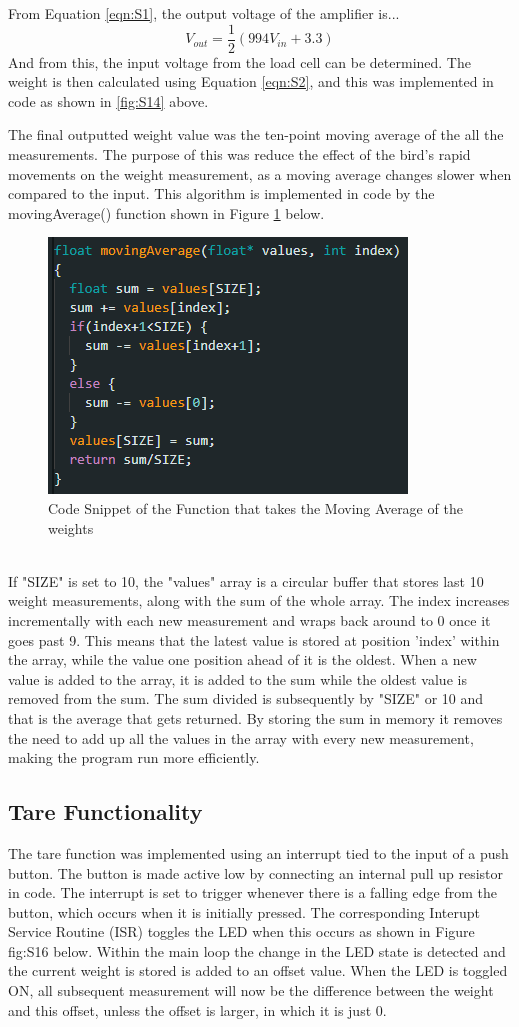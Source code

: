 \documentclass[class=report,11pt,crop=false]{standalone}
\begin{document}
	From Equation \ref{eqn:S1}, the output voltage of the amplifier is...
	\[V_{out} = \frac{1}{2}\left(994V_{in} + 3.3\right) \]
	And from this, the input voltage from the load cell can be determined. The weight is then calculated using Equation \ref{eqn:S2}, and this was implemented in code as shown in \ref{fig:S14} above.
	
	The final outputted weight value was the ten-point moving average of the all the measurements. The purpose of this was reduce the effect of the bird's rapid movements on the weight measurement, as a moving average changes slower when compared to the input. This algorithm is implemented in code by the movingAverage() function shown in Figure \ref{fig:S15} below.
	\begin{figure}[h!]
		\centering
		\includegraphics[width=0.5\linewidth]{Figures/MovingAverage.png}
		\caption{Code Snippet of the Function that takes the Moving Average of the weights}
		\label{fig:S15}
	\end{figure} \\
	If "SIZE" is set to 10, the "values" array is a circular buffer that stores last 10 weight measurements, along with the sum of the whole array. The index increases incrementally with each new measurement and wraps back around to 0 once it goes past 9. This means that the latest value is stored at position 'index' within the array, while the value one position ahead of it is the oldest. When a new value is added to the array, it is added to the sum while the oldest value is removed from the sum. The sum divided is subsequently by "SIZE" or 10 and that is the average that gets returned. By storing the sum in memory it removes the need to add up all the values in the array with every new measurement, making the program run more efficiently.
	
	\subsection{Tare Functionality}
	The tare function was implemented using an interrupt tied to the input of a push button. The button is made active low by connecting an internal pull up resistor in code. The interrupt is set to trigger whenever there is a falling edge from the button, which occurs when it is initially pressed. The corresponding Interupt Service Routine (ISR) toggles the LED when this occurs as shown in Figure {fig:S16} below. Within the main loop the change in the LED state is detected and the current weight is stored is added to an offset value. When the LED is toggled ON, all subsequent measurement will now be the difference between the weight and this offset, unless the offset is larger, in which it is just 0.
	
\end{document}

